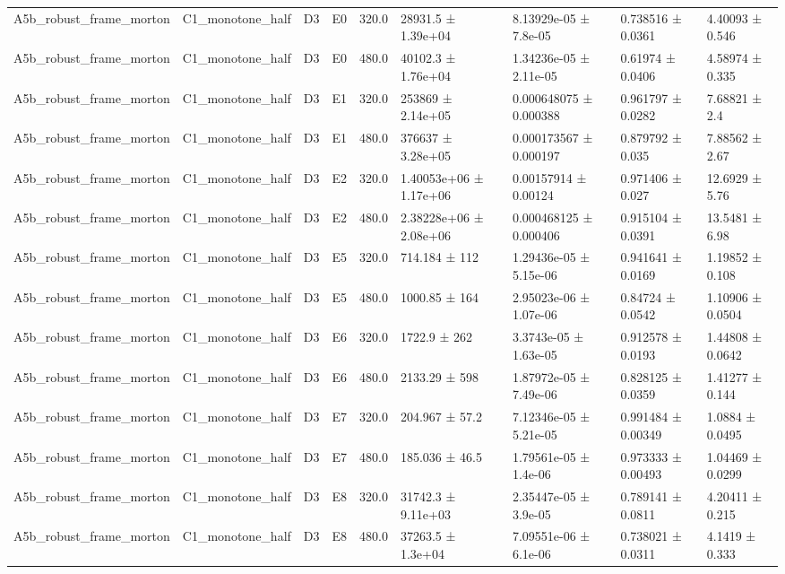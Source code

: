 \begin{table}
\begin{tabular}{lllllllll}
A5b\_robust\_frame\_morton & C1\_monotone\_half & D3 & E0 & 320.0 & 28931.5 ± 1.39e+04 & 8.13929e-05 ± 7.8e-05 & 0.738516 ± 0.0361 & 4.40093 ± 0.546 \\
A5b\_robust\_frame\_morton & C1\_monotone\_half & D3 & E0 & 480.0 & 40102.3 ± 1.76e+04 & 1.34236e-05 ± 2.11e-05 & 0.61974 ± 0.0406 & 4.58974 ± 0.335 \\
A5b\_robust\_frame\_morton & C1\_monotone\_half & D3 & E1 & 320.0 & 253869 ± 2.14e+05 & 0.000648075 ± 0.000388 & 0.961797 ± 0.0282 & 7.68821 ± 2.4 \\
A5b\_robust\_frame\_morton & C1\_monotone\_half & D3 & E1 & 480.0 & 376637 ± 3.28e+05 & 0.000173567 ± 0.000197 & 0.879792 ± 0.035 & 7.88562 ± 2.67 \\
A5b\_robust\_frame\_morton & C1\_monotone\_half & D3 & E2 & 320.0 & 1.40053e+06 ± 1.17e+06 & 0.00157914 ± 0.00124 & 0.971406 ± 0.027 & 12.6929 ± 5.76 \\
A5b\_robust\_frame\_morton & C1\_monotone\_half & D3 & E2 & 480.0 & 2.38228e+06 ± 2.08e+06 & 0.000468125 ± 0.000406 & 0.915104 ± 0.0391 & 13.5481 ± 6.98 \\
A5b\_robust\_frame\_morton & C1\_monotone\_half & D3 & E5 & 320.0 & 714.184 ± 112 & 1.29436e-05 ± 5.15e-06 & 0.941641 ± 0.0169 & 1.19852 ± 0.108 \\
A5b\_robust\_frame\_morton & C1\_monotone\_half & D3 & E5 & 480.0 & 1000.85 ± 164 & 2.95023e-06 ± 1.07e-06 & 0.84724 ± 0.0542 & 1.10906 ± 0.0504 \\
A5b\_robust\_frame\_morton & C1\_monotone\_half & D3 & E6 & 320.0 & 1722.9 ± 262 & 3.3743e-05 ± 1.63e-05 & 0.912578 ± 0.0193 & 1.44808 ± 0.0642 \\
A5b\_robust\_frame\_morton & C1\_monotone\_half & D3 & E6 & 480.0 & 2133.29 ± 598 & 1.87972e-05 ± 7.49e-06 & 0.828125 ± 0.0359 & 1.41277 ± 0.144 \\
A5b\_robust\_frame\_morton & C1\_monotone\_half & D3 & E7 & 320.0 & 204.967 ± 57.2 & 7.12346e-05 ± 5.21e-05 & 0.991484 ± 0.00349 & 1.0884 ± 0.0495 \\
A5b\_robust\_frame\_morton & C1\_monotone\_half & D3 & E7 & 480.0 & 185.036 ± 46.5 & 1.79561e-05 ± 1.4e-06 & 0.973333 ± 0.00493 & 1.04469 ± 0.0299 \\
A5b\_robust\_frame\_morton & C1\_monotone\_half & D3 & E8 & 320.0 & 31742.3 ± 9.11e+03 & 2.35447e-05 ± 3.9e-05 & 0.789141 ± 0.0811 & 4.20411 ± 0.215 \\
A5b\_robust\_frame\_morton & C1\_monotone\_half & D3 & E8 & 480.0 & 37263.5 ± 1.3e+04 & 7.09551e-06 ± 6.1e-06 & 0.738021 ± 0.0311 & 4.1419 ± 0.333 \\

\end{tabular}
\end{table}
